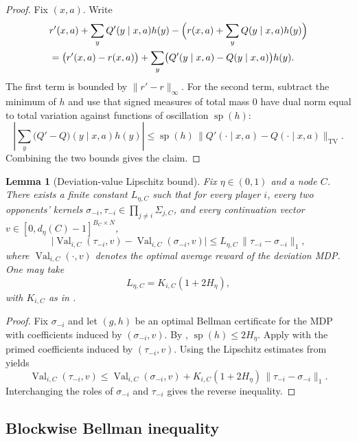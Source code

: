 \documentclass[12pt]{article}
\newtheorem{lemma}[theorem]{Lemma}
\theoremstyle{definition}
\newcommand{\1}{\mathbf{1}}
\DeclareMathOperator{\spn}{sp}
\begin{document}
\begin{proof}
Fix $(x,a)$. Write
\begin{align*}
&r'(x,a)+\sum_y Q'(y\mid x,a)h(y)
-
\Bigl(r(x,a)+\sum_y Q(y\mid x,a)h(y)\Bigr)
\\
&= \bigl(r'(x,a)-r(x,a)\bigr)
+
\sum_y\bigl(Q'(y\mid x,a)-Q(y\mid x,a)\bigr)h(y).
\end{align*}
The first term is bounded by $\|r'-r\|_\infty$. For the second term, subtract the
minimum of $h$ and use that signed measures of total mass $0$ have dual norm equal
to total variation against functions of oscillation $\spn(h)$:
\[
\left|\sum_y\bigl(Q'-Q\bigr)(y\mid x,a)h(y)\right|
\le
\spn(h)\,\|Q'(\cdot\mid x,a)-Q(\cdot\mid x,a)\|_{\mathrm{TV}}.
\]
Combining the two bounds gives the claim.
\end{proof}

\begin{lemma}[Deviation-value Lipschitz bound]
\label{lem:deviation-lipschitz}
Fix $\eta\in(0,1)$ and a node $C$. There exists a finite constant $L_{\eta,C}$
such that for every player $i$, every two opponents' kernels
$\sigma_{-i},\tau_{-i}\in\prod_{j\ne i}\Sigma_{j,C}$, and every continuation vector
$v\in[0,d_\eta(C)-1]^{B_C\times N}$,
\[
\bigl|\operatorname{Val}_{i,C}(\tau_{-i},v)-\operatorname{Val}_{i,C}(\sigma_{-i},v)\bigr|
\le L_{\eta,C}\,\|\tau_{-i}-\sigma_{-i}\|_1,
\]
where $\operatorname{Val}_{i,C}(\cdot,v)$ denotes the optimal average reward of the
deviation MDP. One may take
\[
L_{\eta,C}=K_{i,C}(1+2H_\eta),
\]
with $K_{i,C}$ as in .
\end{lemma}

\begin{proof}
Fix $\sigma_{-i}$ and let $(g,h)$ be an optimal Bellman certificate for the MDP with
coefficients induced by $(\sigma_{-i},v)$. By ,
$\spn(h)\le 2H_\eta$. Apply  with the primed
coefficients induced by $(\tau_{-i},v)$. Using the Lipschitz estimates from
 yields
\[
\operatorname{Val}_{i,C}(\tau_{-i},v)
\le
\operatorname{Val}_{i,C}(\sigma_{-i},v)
+
K_{i,C}(1+2H_\eta)\,\|\tau_{-i}-\sigma_{-i}\|_1.
\]
Interchanging the roles of $\sigma_{-i}$ and $\tau_{-i}$ gives the reverse
inequality.
\end{proof}


\subsection{Blockwise Bellman inequality}
\end{document}
